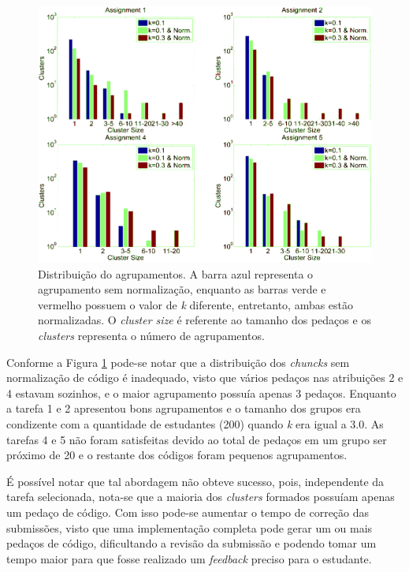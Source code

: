 	\begin{figure}
		\centering
		\includegraphics[width=0.7\linewidth]{imagem/clusteringPerformance}
		\caption{Distribuição do agrupamentos. A barra azul representa o agrupamento
			sem normalização, enquanto as barras verde e vermelho possuem o valor
			de \textit{k} diferente, entretanto, ambas estão normalizadas. O
			\textit{cluster size} é referente ao tamanho dos pedaços e os
			\textit{clusters} representa o número de agrupamentos.}
		\label{fig:clusteringPerformance}
	\end{figure}
    
	Conforme a Figura \ref{fig:clusteringPerformance} pode-se notar que a
	distribuição dos \textit{chuncks} sem normalização de código é inadequado,
	visto que vários pedaços nas atribuições 2 e 4 estavam sozinhos, e o maior
	agrupamento possuía apenas 3 pedaços. Enquanto a tarefa 1 e 2 apresentou
	bons agrupamentos e o tamanho dos grupos era condizente com a quantidade de
	estudantes (200) quando \textit{k} era igual a 3.0. As tarefas 4 e 5 não foram
	satisfeitas devido ao total de pedaços em um grupo ser próximo de 20 e o
	restante dos códigos foram pequenos agrupamentos.
	
	É possível notar que tal abordagem não obteve sucesso, pois, independente da
	tarefa selecionada, nota-se que a maioria dos \textit{clusters} formados
	possuíam apenas um pedaço de código. Com isso pode-se aumentar o tempo de
	correção das submissões, visto que uma implementação completa pode gerar um
	ou mais pedaços de código, dificultando a revisão da submissão e podendo tomar
	um tempo maior para que fosse realizado um \textit{feedback} preciso para o
	estudante.